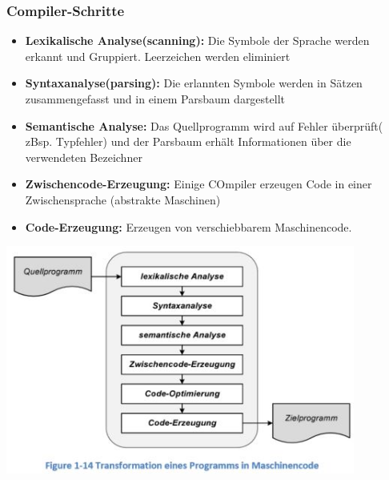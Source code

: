 \subsubsection{Compiler-Schritte}
\begin{multicols}{2}
    \begin{itemize}
        \item \textbf{Lexikalische Analyse(scanning):}\newline
        Die Symbole der Sprache werden erkannt und Gruppiert. Leerzeichen werden eliminiert
        \item \textbf{Syntaxanalyse(parsing):} Die erlannten Symbole werden in Sätzen zusammengefasst und in einem Parsbaum dargestellt
        \item \textbf{Semantische Analyse:} Das Quellprogramm wird auf Fehler überprüft( zBsp. Typfehler) und der Parsbaum erhält Informationen über die verwendeten Bezeichner
        \item \textbf{Zwischencode-Erzeugung:} Einige COmpiler erzeugen Code in einer Zwischensprache (abstrakte Maschinen)
        \item \textbf{Code-Erzeugung:} Erzeugen von verschiebbarem Maschinencode.      
    \end{itemize}

    \includegraphics[height=7.5cm]{images/CompilerWorkflow2}
\end{multicols}

